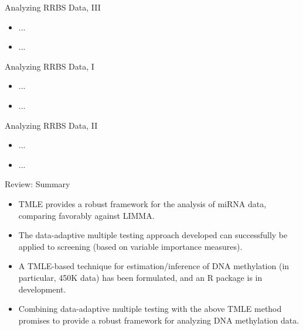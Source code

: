 \documentclass[12pt,t,handout]{beamer}
\begin{document}
\begin{frame}[c]{Analyzing RRBS Data, III}

\begin{center}
\begin{itemize}
  \item ...
  \item ...
\end{itemize}
\end{center}



\end{frame}



\begin{frame}[c]{Analyzing RRBS Data, I}

\begin{center}
\begin{itemize}
  \item ...
  \item ...
\end{itemize}
\end{center}



\end{frame}



\begin{frame}[c]{Analyzing RRBS Data, II}

\begin{center}
\begin{itemize}
  \item ...
  \item ...
\end{itemize}
\end{center}



\end{frame}



\begin{frame}[c]{Review: Summary}

\begin{center}
\begin{itemize}
  \itemsep12pt
  \item TMLE provides a robust framework for the analysis of miRNA data,
    comparing favorably against LIMMA.
  \item The data-adaptive multiple testing approach developed can successfully
    be applied to screening (based on variable importance measures).
  \item A TMLE-based technique for estimation/inference of DNA methylation
    (in particular, 450K data) has been formulated, and an R package is in
    development.
  \item Combining data-adaptive multiple testing with the above TMLE method
    promises to provide a robust framework for analyzing DNA methylation data.
\end{itemize}
\end{center}


\end{frame}
\end{document}

